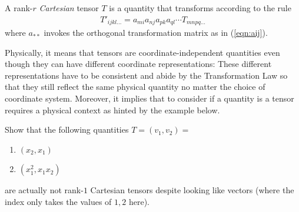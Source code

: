 \begin{proper}
\label{proper:translaw}
A rank-$r$ \textit{Cartesian} tensor $T$ is a quantity that transforms according to the rule\footnotemark
\begin{align}
T'_{ijkl\ldots} = a_{mi}a_{nj}a_{pk}a_{ql}\cdots T_{mnpq\ldots}
\end{align}
where $a_{**}$ invokes the orthogonal transformation matrix as in (\ref{eqn:aij}).
\end{proper}
 Physically, it means that tensors are coordinate-independent quantities even though they can have different coordinate representations: These different representations have to be consistent and abide by the Transformation Law so that they still reflect the same physical quantity no matter the choice of coordinate system. Moreover, it implies that to consider if a quantity is a tensor requires a physical context as hinted by the example below.
\begin{exmp}
Show that the following quantities $T = (v_1, v_2) = $ 
\begin{enumerate}[label=(\alph*)]
    \item $(x_2,x_1)$
    \item $(x_1^2,x_1x_2)$
\end{enumerate}
are actually not rank-$1$ Cartesian tensors despite looking like vectors (where the index only takes the values of $1,2$ here).
\end{exmp}
